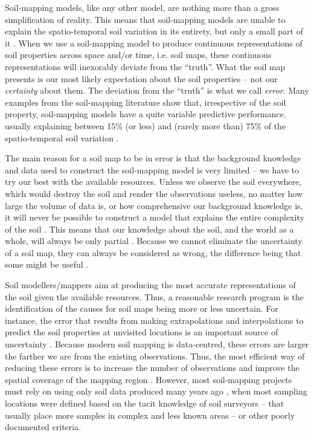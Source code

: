 Soil-mapping models, like any other model, are nothing more than a gross simplification of reality.
This means that soil-mapping models are unable to explain the spatio-temporal soil variation in 
its entirety, but only a small part of it \citep{Heuvelink1998a}. When we use a soil-mapping model
to produce continuous representations of soil properties across space and/or time, i.e. soil
maps, these continuous representations will inexorably deviate from the ``truth''. What the soil map
presents is our most likely expectation about the soil properties -- not our \textit{certainty}
about them. The deviation from the ``truth'' is what we call \textit{error}. Many examples from the 
soil-mapping literature show that, irrespective of the soil property, soil-mapping models have a 
quite variable predictive performance, usually explaining between 15\% (or less) and (rarely more 
than) 75\% of the spatio-temporal soil variation \citep{MooreEtAl1993, OdehEtAl1994, GesslerEtAl1995, 
McKenzieEtAl1999, GobinEtAl2001, SumflethEtAl2008, SunEtAl2012, ViscarraRosselEtAl2013, 
NussbaumEtAl2014, HenglEtAl2015, GaschEtAl2015, HeungEtAl2016}.

The main reason for a soil map to be in error is that the background knowledge and data used to 
construct the soil-mapping model is very limited -- we have to try our best with the available 
resources. Unless we observe the soil everywhere, which would destroy the soil and render the 
observations useless, no matter how large the volume of data is, or how comprehensive our background
knowledge is, it will never be possible to construct a model that explains the entire complexity of 
the soil \citep{Tukey1997}. This means that our knowledge about the soil, and the world as a whole, 
will always be only partial \citep{Box1993}. Because we cannot eliminate the uncertainty of a soil 
map, they can always be considered as wrong, the difference being that some might be useful 
\citep{Box1976}.

Soil modellers/mappers aim at producing the most accurate representations of the soil given the 
available resources. Thus, a reasonable research program is the identification of the causes for 
soil maps being more or less uncertain. For instance, the error that results from making 
extrapolations and interpolations to predict the soil properties at unvisited locations is an 
important source of uncertainty \citep{HeuvelinkEtAl1999, RefsgaardEtAl2006}. Because modern soil 
mapping is data-centred, these errors are larger the farther we are from the existing 
observations. Thus, the most efficient way of reducing these errors is to increase the number of 
observations and improve the spatial coverage of the mapping region \citep{BrusEtAl2007a}. However, most 
soil-mapping projects must rely on using only soil data produced many years ago \citep{KempenEtAl2009, 
HenglEtAl2014, PoggioEtAl2014, NussbaumEtAl2014, MulderEtAl2016}, when most sampling locations were 
defined based on the tacit knowledge of soil surveyors -- that usually place more samples in complex 
and less known areas \citep{Rossiter2000} -- or other poorly documented criteria.

